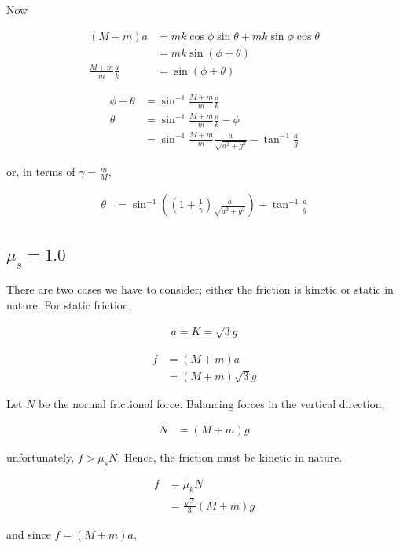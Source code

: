 \documentclass{article}
\begin{document}
Now

\begin{align*}
(M+m)a &= mk\cos\phi\sin\theta + mk\sin\phi\cos\theta \\
&= mk\sin(\phi + \theta) \\
\frac{M+m}{m}\frac{a}{k} &= \sin(\phi + \theta)
\end{align*}

\begin{align*}
\phi + \theta &= \sin^{-1}{\frac{M+m}{m}\frac{a}{k}} \\
\theta &= \sin^{-1}{\frac{M+m}{m}\frac{a}{k}} - \phi \\
&= \sin^{-1}{\frac{M+m}{m}\frac{a}{\sqrt{a^2 + g^2}}} - \tan^{-1}{\frac{a}{g}}
\end{align*}

or, in terms of $\gamma = \frac{m}{M}$,

\begin{align*}
\theta &= \sin^{-1}((1 + \frac{1}{\gamma}) \frac{a}{\sqrt{a^2 + g^2}}) - \tan^{-1}{\frac{a}{g}}
\end{align*}

\subsection{$\mu_s = 1.0$}

There are two cases we have to consider; either the friction is kinetic or static in nature. For static friction, 

\begin{align*}
a = K = \sqrt{3}g
\end{align*}

\begin{align*}
f &= (M+m)a \\
&= (M+m)\sqrt{3}g
\end{align*}

Let $N$ be the normal frictional force. Balancing forces in the vertical direction,

\begin{align*}
N &= (M+m)g
\end{align*}

unfortunately, $f > \mu_sN$. Hence, the friction must be kinetic in nature.

\begin{align*}
f &= \mu_kN \\
&= \frac{\sqrt 3}{3}(M+m)g
\end{align*}

and since $f = (M+m)a$,
\end{document}
